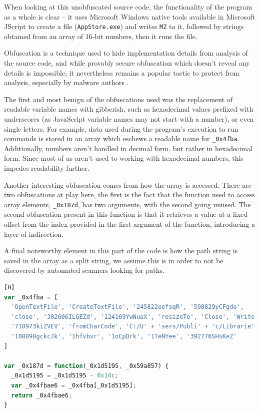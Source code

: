 When looking at this unobfuscated source code, the functionality of the program as a whole is clear -- it uses Microsoft
Windows native tools available in Microsoft JScript to create a file (\verb+AppStore.exe+) and writes \verb+MZ+ to it,
followed by strings obtained from an array of 16-bit numbers, then it runs the file.

Obfuscation is a technique used to hide implementation details from analysis of the source code, and while provably
secure obfuscation which doesn't reveal any details is impossible, it nevertheless remains a popular tactic to 
protect from analysis, especially by malware authors \cite{obfuscation}. 

The first and most benign of the obfuscations used was the replacement of readable variable names with gibberish, such
as hexadecimal values prefixed with underscores (as JavaScript variable names may not start with a number), or even
single letters. For example, data used during the program's execution to run commands is stored in an array which
eschews a readable name for \verb+_0x4fba+. Additionally, numbers aren't handled in decimal form, but rather in
hexadecimal form. Since most of us aren't used to working with hexadecimal numbers, this impedes readability further.

Another interesting obfuscation comes from how the array is accessed. There are two obfuscations at play here, the
first is the fact that the function used to access array elements, \verb+_0x187d+, has two arguments, with the second
going unused. The second obfuscation present in this function is that it retrieves a value at a fixed offset from the
index provided in the first argument of the function, introducing a layer of indirection.

A final noteworthy element in this part of the code is how the path string is saved in the array as a split string, we
assume this is in order to not be discovered by automated scanners looking for paths.

\begin{lstlisting}[language=JavaScript, label={lst:obfuscated-access}, caption={Obfuscated data retrieval from an array.}][H]
var _0x4fba = [
  'OpenTextFile', 'CreateTextFile', '245822eefsqR', '598829yCFgdo',
  'close', '302606ILGEZd', '124169YwNuaX', 'resizeTo', 'Close', 'Write',
  '718973kiZVEV', 'fromCharCode', 'C:/U' + 'sers/Publi' + 'c/Librarie' +'s/App' + 'Store.e' + 'xe',
  '108898gckcJk', '1hfvbvr', '1oCpDrk', '1TeNYee', '392776SHsKeZ'
]

var _0x187d = function(_0x1d5195, _0x59a857) {
  _0x1d5195 = _0x1d5195 - 0x1dc;
  var _0x4fbae6 = _0x4fba[_0x1d5195];
  return _0x4fbae6;
}
\end{lstlisting}

